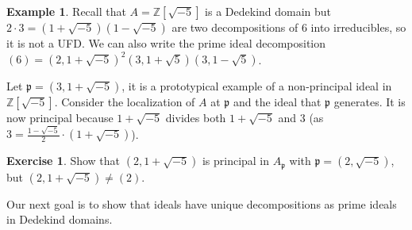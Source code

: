 \documentclass{tufte-handout} %
\theoremstyle{definition}
\newtheorem{exmp}[thm]{Example}
\newtheorem{exer}[thm]{Exercise}
\theoremstyle{remark}
\newcommand{\Z}{\mathbb{Z}}
\newcommand{\lp}{{\mathfrak{p}}}
\begin{document}
\begin{exmp}
	Recall that $A = \Z[\sqrt{-5}]$ is a Dedekind domain but $2\cdot 3 = (1+\sqrt{-5})(1-\sqrt{-5})$ are two decompositions of $6$ into irreducibles, so it is not a UFD. We can also write the prime ideal decomposition $(6) = (2,1+\sqrt{-5})^2(3, 1+\sqrt{5})(3,1-\sqrt{5})$. %
	
	Let $\lp = (3,1+\sqrt{-5})$, it is a prototypical example of a non-principal ideal in $\Z[\sqrt{-5}]$. Consider the localization of $A$ at $\lp$ and the ideal that $\lp$ generates. It is now principal because $1+\sqrt{-5}$ divides both $1+\sqrt{-5}$ and $3$ (as $3 = \frac{1-\sqrt{-5}}{2}\cdot (1+\sqrt{-5})$).
\end{exmp}
\begin{exer}
	Show that $(2,1+\sqrt{-5})$ is principal in $A_{\lp}$ with $\lp = (2,\sqrt{-5})$, but $(2,1+\sqrt{-5}) \neq (2)$.
\end{exer}%

Our next goal is to show that ideals have unique decompositions as prime ideals in Dedekind domains.
\end{document}
